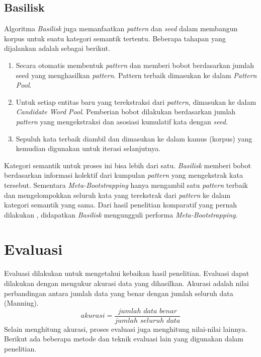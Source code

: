 \subsection{Basilisk}
Algoritma \textit{Basilisk} \citep{thelen2002bootstrapping} juga memanfaatkan \textit{pattern} dan \textit{seed} dalam membangun korpus untuk suatu kategori semantik tertentu. Beberapa tahapan yang dijalankan adalah sebagai berikut.
\begin{enumerate}
  \item Secara otomatis membentuk \textit{pattern} dan memberi bobot berdasarkan jumlah seed yang menghasilkan \textit{pattern}. Pattern terbaik dimasukan ke dalam \textit{Pattern Pool}.
  \item Untuk setiap entitas baru yang terekstraksi dari \textit{pattern}, dimasukan ke dalam \textit{Candidate Word Pool}. Pemberian bobot dilakukan berdasarkan jumlah \textit{pattern} yang mengekstraksi dan asosiasi kumulatif kata dengan \textit{seed}.
  \item Sepuluh kata terbaik diambil dan dimasukan ke dalam kamus (korpus) yang kemudian digunakan untuk iterasi selanjutnya. 
\end{enumerate}

Kategori semantik untuk proses ini bisa lebih dari satu. \textit{Basilisk} memberi bobot berdasarkan informasi kolektif dari kumpulan \textit{pattern} yang mengekstrak kata tersebut. Sementara \textit{Meta-Bootstrapping} hanya mengambil satu \textit{pattern} terbaik dan mengelompokkan seluruh kata yang terekstrak dari \textit{pattern} ke dalam kategori semantik yang sama. Dari hasil penelitian komparatif yang pernah dilakukan \citep{riloff2003learning}, didapatkan \textit{Basilisk} mengungguli performa \textit{Meta-Bootstrapping}. 


\section{Evaluasi}
Evaluasi dilakukan untuk mengetahui kebaikan hasil penelitian. Evaluasi dapat dilakukan dengan mengukur akurasi data yang dihasilkan. Akurasi adalah nilai perbandingan antara jumlah data yang benar dengan jumlah seluruh data (Manning). 
\[ akurasi=\frac{jumlah\,\,data\,\,benar}{jumlah\,\,seluruh\,\,data} \]
Selain menghitung akurasi, proses evaluasi juga menghitung nilai-nilai lainnya. Berikut ada beberapa metode dan teknik evaluasi lain yang digunakan dalam penelitian.

